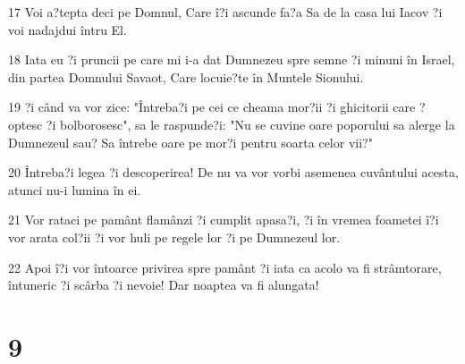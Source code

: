 \par 17 Voi a?tepta deci pe Domnul, Care î?i ascunde fa?a Sa de la casa lui Iacov ?i voi nadajdui întru El.
\par 18 Iata eu ?i pruncii pe care mi i-a dat Dumnezeu spre semne ?i minuni în Israel, din partea Domnului Savaot, Care locuie?te în Muntele Sionului.
\par 19 ?i când va vor zice: "Întreba?i pe cei ce cheama mor?ii ?i ghicitorii care ?optesc ?i bolborosesc", sa le raspunde?i: "Nu se cuvine oare poporului sa alerge la Dumnezeul sau? Sa întrebe oare pe mor?i pentru soarta celor vii?"
\par 20 Întreba?i legea ?i descoperirea! De nu va vor vorbi asemenea cuvântului acesta, atunci nu-i lumina în ei.
\par 21 Vor rataci pe pamânt flamânzi ?i cumplit apasa?i, ?i în vremea foametei î?i vor arata col?ii ?i vor huli pe regele lor ?i pe Dumnezeul lor.
\par 22 Apoi î?i vor întoarce privirea spre pamânt ?i iata ca acolo va fi strâmtorare, întuneric ?i scârba ?i nevoie! Dar noaptea va fi alungata!

\chapter{9}

